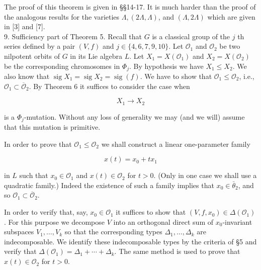 \documentclass[10pt]{article}
\begin{document}
The proof of this theorem is given in §§14-17. It is much harder than the proof of the analogous results for the varieties $\Lambda,(2 \Lambda, \Lambda)$, and $(\Lambda, 2 \Lambda)$ which are given in [3] and [7].\\
9. Sufficiency part of Theorem 5. Recall that $G$ is a classical group of the $j$ th series defined by a pair $(V, f)$ and $j \in\{4,6,7,9,10\}$. Let $\mathcal{O}_{1}$ and $\mathcal{O}_{2}$ be two nilpotent orbits of $G$ in its Lie algebra $L$. Let $X_{1}=X\left(\mathcal{O}_{1}\right)$ and $X_{2}=X\left(\mathcal{O}_{2}\right)$ be the corresponding chromosomes in $\Phi_{j}$. By hypothesis we have $X_{1} \leqslant X_{2}$. We also know that $\operatorname{sig} X_{1}=\operatorname{sig} X_{2}=\operatorname{sig}(f)$. We have to show that $\mathcal{O}_{1} \leqslant \mathcal{O}_{2}$, i.e., $\mathcal{O}_{1} \subset \overline{\mathcal{O}}_{2}$. By Theorem 6 it suffices to consider the case when


\begin{equation*}
X_{1} \rightarrow X_{2} \tag{9.1}
\end{equation*}


is a $\Phi_{j}$-mutation. Without any loss of generality we may (and we will) assume that this mutation is primitive.

In order to prove that $\mathcal{O}_{1} \leqslant \mathcal{O}_{2}$ we shall construct a linear one-parameter family


\begin{equation*}
x(t)=x_{0}+t x_{1} \tag{9.2}
\end{equation*}


in $L$ such that $x_{0} \in \mathcal{O}_{1}$ and $x(t) \in \mathcal{O}_{2}$ for $t>0$. (Only in one case we shall use a quadratic family.) Indeed the existence of such a family implies that $x_{0} \in \bar{\theta}_{2}$, and so $\mathcal{O}_{1} \subset \overline{\mathcal{O}}_{2}$.

In order to verify that, say, $x_{0} \in \mathcal{O}_{1}$ it suffices to show that $\left(V, f, x_{0}\right) \in \Delta\left(\mathcal{O}_{1}\right)$. For this purpose we decompose $V$ into an orthogonal direct sum of $x_{0}$-invariant subspaces $V_{1}, \ldots, V_{k}$ so that the corresponding types $\Delta_{1}, \ldots, \Delta_{k}$ are indecomposable. We identify these indecomposable types by the criteria of §5 and verify that $\Delta\left(\mathcal{O}_{1}\right)=\Delta_{1}+\cdots+\Delta_{k}$. The same method is used to prove that $x(t) \in \mathcal{O}_{2}$ for $t>0$.
\end{document}
